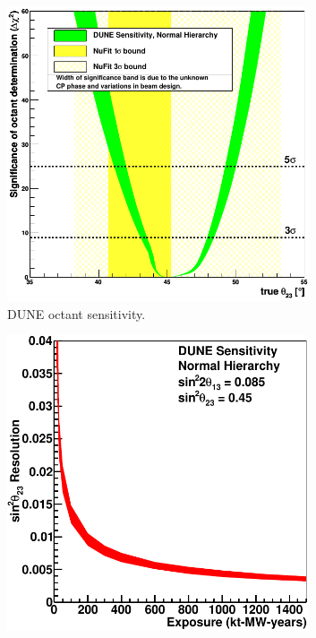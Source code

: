 \begin{figure}
  \centering
  \begin{subfigure}[t]{0.48\linewidth}
    \centering
    \includegraphics[width=0.98\textwidth]{DUNEOctantSensitivity.pdf}
    \caption{DUNE octant sensitivity.}
    \label{fig:DUNEOctantSensitivity}
  \end{subfigure}
  \hfill
  \begin{subfigure}[t]{0.48\linewidth}
    \centering
    \includegraphics[width=0.98\textwidth]{DUNETheta23Resolution.pdf}

\end{subfigure}
\end{figure}
